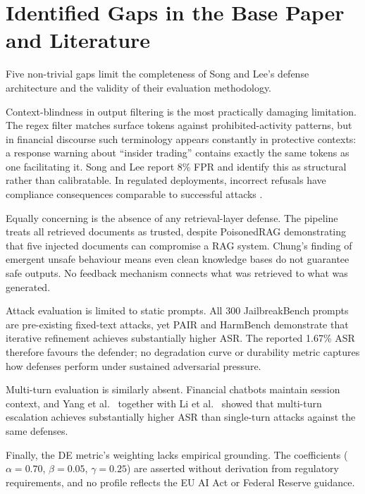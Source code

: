 \documentclass[journal,10pt]{IEEEtran}
\begin{document}
\section{Identified Gaps in the Base Paper and Literature}

Five non-trivial gaps limit the completeness of Song and Lee's defense architecture \cite{song2026defending} and the validity of their evaluation methodology.

Context-blindness in output filtering is the most practically damaging limitation. The regex filter matches surface tokens against prohibited-activity patterns, but in financial discourse such terminology appears constantly in protective contexts: a response warning about ``insider trading'' contains exactly the same tokens as one facilitating it. Song and Lee report 8\% FPR and identify this as structural rather than calibratable. In regulated deployments, incorrect refusals have compliance consequences comparable to successful attacks \cite{euaiact2024, federalreserve2011sr}.

Equally concerning is the absence of any retrieval-layer defense. The pipeline treats all retrieved documents as trusted, despite PoisonedRAG \cite{zou2025poisonedrag} demonstrating that five injected documents can compromise a RAG system. Chung's \cite{chung2025empirical} finding of emergent unsafe behaviour means even clean knowledge bases do not guarantee safe outputs. No feedback mechanism connects what was retrieved to what was generated.

Attack evaluation is limited to static prompts. All 300 JailbreakBench prompts are pre-existing fixed-text attacks, yet PAIR \cite{chao2023jailbreaking} and HarmBench \cite{mazeika2024harmbench} demonstrate that iterative refinement achieves substantially higher ASR. The reported 1.67\% ASR therefore favours the defender; no degradation curve or durability metric captures how defenses perform under sustained adversarial pressure.

Multi-turn evaluation is similarly absent. Financial chatbots maintain session context, and Yang et al.\ \cite{yang2024multiturn} together with Li et al.\ \cite{li2025fitd} showed that multi-turn escalation achieves substantially higher ASR than single-turn attacks against the same defenses.

Finally, the DE metric's weighting lacks empirical grounding. The coefficients ($\alpha\!=\!0.70$, $\beta\!=\!0.05$, $\gamma\!=\!0.25$) are asserted without derivation from regulatory requirements, and no profile reflects the EU AI Act or Federal Reserve guidance.
\end{document}
